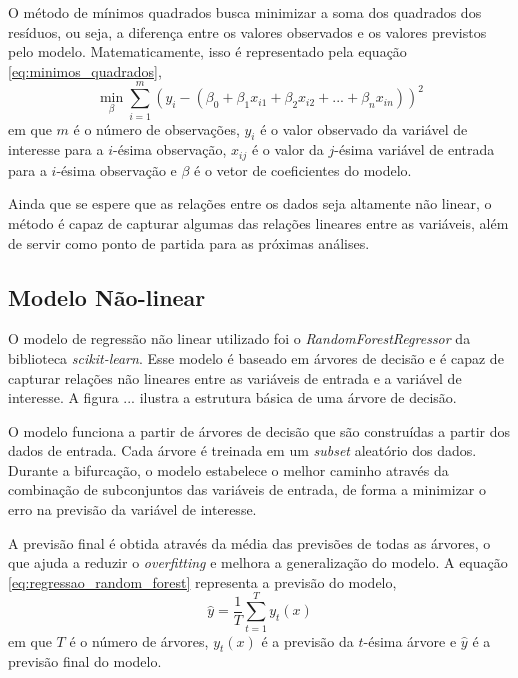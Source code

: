 O método de mínimos quadrados busca minimizar a soma dos quadrados dos resíduos, ou seja, a diferença entre os valores
observados e os valores previstos pelo modelo. Matematicamente, isso é representado pela equação \ref{eq:minimos_quadrados},
\begin{equation}
\label{eq:minimos_quadrados}
\min_{\beta} \sum_{i=1}^{m} \left(y_i - (\beta_0 + \beta_1 x_{i1} + \beta_2 x_{i2} + ... + \beta_n x_{in})\right)^2
\end{equation}
em que $m$ é o número de observações, $y_i$ é o valor observado da variável de interesse para a $i$-ésima observação,
$x_{ij}$ é o valor da $j$-ésima variável de entrada para a $i$-ésima observação e $\beta$ é o vetor de coeficientes
do modelo.

Ainda que se espere que as relações entre os dados seja altamente não linear, o método é capaz de capturar algumas
das relações lineares entre as variáveis, além de servir como ponto de partida para as próximas análises.


\subsection{Modelo Não-linear}
O modelo de regressão não linear utilizado foi o \textit{RandomForestRegressor} da biblioteca \textit{scikit-learn}.
Esse modelo é baseado em árvores de decisão e é capaz de capturar relações não lineares entre as variáveis de entrada e 
a variável de interesse. A figura ... ilustra a estrutura básica de uma árvore de decisão.

O modelo funciona a partir de árvores de decisão que são construídas a partir dos dados de entrada. Cada árvore é treinada
em um \textit{subset} aleatório dos dados. Durante a bifurcação, o modelo estabelece o melhor caminho através da
combinação de subconjuntos das variáveis de entrada, de forma a minimizar o erro na previsão da variável de interesse.

A previsão final é obtida através da média das previsões de todas as árvores, o que ajuda a reduzir o \textit{overfitting}
e melhora a generalização do modelo. A equação \ref{eq:regressao_random_forest} representa a previsão do modelo,
\begin{equation}
\label{eq:regressao_random_forest}
\hat{y} = \frac{1}{T} \sum_{t=1}^{T} y_t(x)
\end{equation}
em que $T$ é o número de árvores, $y_t(x)$ é a previsão da $t$-ésima árvore e $\hat{y}$ é a previsão final do modelo.



